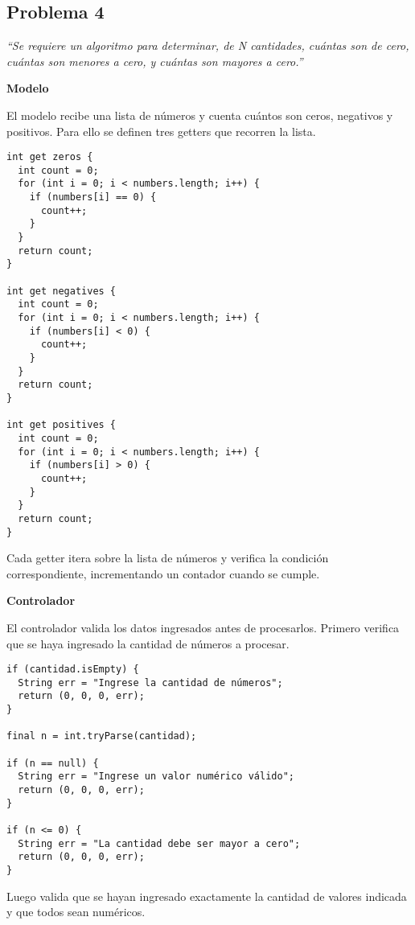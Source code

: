 \subsection{Problema 4}

\textit {“Se requiere un algoritmo para determinar, de N cantidades, cuántas son de cero, cuántas son menores a cero, y cuántas son mayores a cero.”}

\textbf{Modelo}

El modelo recibe una lista de números y cuenta cuántos son ceros, negativos y positivos. Para ello se definen tres getters que recorren la lista.

\begin{center}
\begin{lstlisting}
int get zeros {
  int count = 0;
  for (int i = 0; i < numbers.length; i++) {
    if (numbers[i] == 0) {
      count++;
    }
  }
  return count;
}

int get negatives {
  int count = 0;
  for (int i = 0; i < numbers.length; i++) {
    if (numbers[i] < 0) {
      count++;
    }
  }
  return count;
}

int get positives {
  int count = 0;
  for (int i = 0; i < numbers.length; i++) {
    if (numbers[i] > 0) {
      count++;
    }
  }
  return count;
}
\end{lstlisting}
\end{center}

Cada getter itera sobre la lista de números y verifica la condición correspondiente, incrementando un contador cuando se cumple.

\textbf{Controlador}

El controlador valida los datos ingresados antes de procesarlos. Primero verifica que se haya ingresado la cantidad de números a procesar.

\begin{center}
\begin{lstlisting}
if (cantidad.isEmpty) {
  String err = "Ingrese la cantidad de números";
  return (0, 0, 0, err);
}

final n = int.tryParse(cantidad);

if (n == null) {
  String err = "Ingrese un valor numérico válido";
  return (0, 0, 0, err);
}

if (n <= 0) {
  String err = "La cantidad debe ser mayor a cero";
  return (0, 0, 0, err);
}
\end{lstlisting}
\end{center}

Luego valida que se hayan ingresado exactamente la cantidad de valores indicada y que todos sean numéricos.

